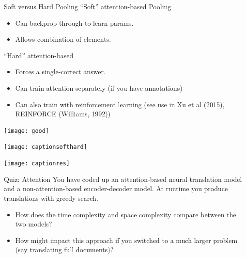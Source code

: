 \documentclass{beamer}
\begin{document}


\begin{frame}{Soft  versus Hard Pooling}
  ``Soft'' attention-based Pooling 
  \begin{itemize}
  \item Can backprop through to learn params.
  \item Allows combination of elements. 
  \end{itemize}

  ``Hard'' attention-based  
  \begin{itemize}
  \item Forces a single-correct answer.
  \item Can train attention separately (if you have annotations)
  \item Can also train with reinforcement learning (see use in Xu et al (2015), REINFORCE (Williams, 1992))
  \end{itemize}
\end{frame}

\begin{frame}
  \begin{center}
    \texttt{[image: good]}
  \end{center}
\end{frame}

\begin{frame}
  \begin{center}
    \texttt{[image: captionsofthard]}
  \end{center}
\end{frame}


\begin{frame}
  \begin{center}
    \texttt{[image: captionres]}
  \end{center}
\end{frame}


\begin{frame}{Quiz: Attention}
  You have coded up an attention-based neural translation 
  model and a non-attention-based encoder-decoder model. 
  At runtime you produce translations with greedy search. 
  \begin{itemize}
  \item  How does the time complexity and space complexity compare
    between the two models?
  \item How might impact this approach if you switched to a much
    larger problem (say translating full documents)?
  \end{itemize}
\end{frame}
\end{document}
